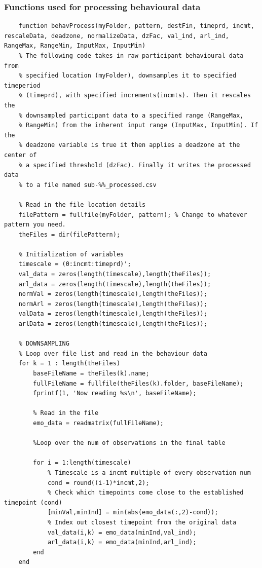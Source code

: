 \subsubsection{Functions used for processing behavioural data}
\begin{lstlisting}
    function behavProcess(myFolder, pattern, destFin, timeprd, incmt, rescaleData, deadzone, normalizeData, dzFac, val_ind, arl_ind, RangeMax, RangeMin, InputMax, InputMin)
    % The following code takes in raw participant behavioural data from
    % specified location (myFolder), downsamples it to specified timeperiod
    % (timeprd), with specified increments(incmts). Then it rescales the
    % downsampled participant data to a specified range (RangeMax,
    % RangeMin) from the inherent input range (InputMax, InputMin). If the
    % deadzone variable is true it then applies a deadzone at the center of
    % a specified threshold (dzFac). Finally it writes the processed data
    % to a file named sub-%%_processed.csv

    % Read in the file location details
    filePattern = fullfile(myFolder, pattern); % Change to whatever pattern you need.
    theFiles = dir(filePattern);

    % Initialization of variables
    timescale = (0:incmt:timeprd)';
    val_data = zeros(length(timescale),length(theFiles));
    arl_data = zeros(length(timescale),length(theFiles));
    normVal = zeros(length(timescale),length(theFiles));
    normArl = zeros(length(timescale),length(theFiles));
    valData = zeros(length(timescale),length(theFiles));
    arlData = zeros(length(timescale),length(theFiles));
    
    % DOWNSAMPLING
    % Loop over file list and read in the behaviour data
    for k = 1 : length(theFiles)
        baseFileName = theFiles(k).name;
        fullFileName = fullfile(theFiles(k).folder, baseFileName);
        fprintf(1, 'Now reading %s\n', baseFileName);

        % Read in the file
        emo_data = readmatrix(fullFileName);

        %Loop over the num of observations in the final table
        
        for i = 1:length(timescale)
            % Timescale is a incmt multiple of every observation num
            cond = round((i-1)*incmt,2);
            % Check which timepoints come close to the established timepoint (cond)
            [minVal,minInd] = min(abs(emo_data(:,2)-cond));
            % Index out closest timepoint from the original data
            val_data(i,k) = emo_data(minInd,val_ind);
            arl_data(i,k) = emo_data(minInd,arl_ind);
        end
    end
    

\end{lstlisting}
